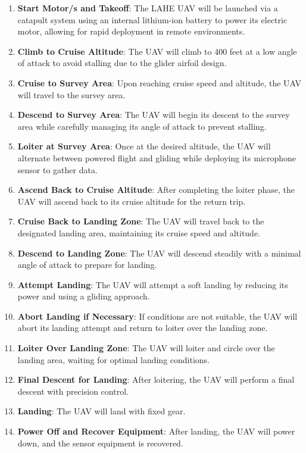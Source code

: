 \documentclass[12pt]{article}
\begin{document}
	\begin{enumerate}
		\item \textbf{Start Motor/s and Takeoff}: The LAHE UAV will be launched via a catapult system using an internal lithium-ion battery to power its electric motor, allowing for rapid deployment in remote environments.
		
		\item \textbf{Climb to Cruise Altitude}: The UAV will climb to 400 feet at a low angle of attack to avoid stalling due to the glider airfoil design.
		
		\item \textbf{Cruise to Survey Area}: Upon reaching cruise speed and altitude, the UAV will travel to the survey area.
		
		\item \textbf{Descend to Survey Area}: The UAV will begin its descent to the survey area while carefully managing its angle of attack to prevent stalling.
		
		\item \textbf{Loiter at Survey Area}: Once at the desired altitude, the UAV will alternate between powered flight and gliding while deploying its microphone sensor to gather data.
		
		\item \textbf{Ascend Back to Cruise Altitude}: After completing the loiter phase, the UAV will ascend back to its cruise altitude for the return trip.
		
		\item \textbf{Cruise Back to Landing Zone}: The UAV will travel back to the designated landing area, maintaining its cruise speed and altitude.
		
		\item \textbf{Descend to Landing Zone}: The UAV will descend steadily with a minimal angle of attack to prepare for landing.
		
		\item \textbf{Attempt Landing}: The UAV will attempt a soft landing by reducing its power and using a gliding approach.
		
		\item \textbf{Abort Landing if Necessary}: If conditions are not suitable, the UAV will abort its landing attempt and return to loiter over the landing zone.
		
		\item \textbf{Loiter Over Landing Zone}: The UAV will loiter and circle over the landing area, waiting for optimal landing conditions.
		
		\item \textbf{Final Descent for Landing}: After loitering, the UAV will perform a final descent with precision control.
		
		\item \textbf{Landing}: The UAV will land with fixed gear.
		
		\item \textbf{Power Off and Recover Equipment}: After landing, the UAV will power down, and the sensor equipment is recovered.
	\end{enumerate}
\end{document}
